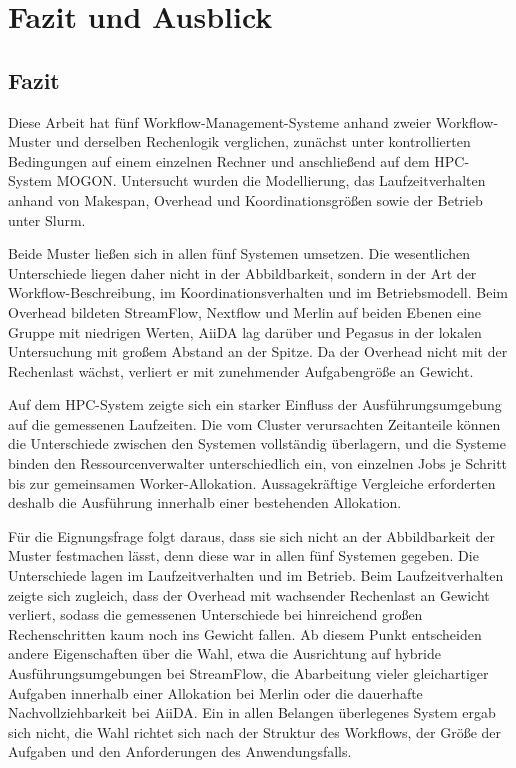 
\chapter{Fazit und Ausblick}
\label{sec:conclusion}

\section{Fazit}
\label{sec:conclusion:fazit}

Diese Arbeit hat fünf Workflow-Management-Systeme anhand zweier
Workflow-Muster und derselben Rechenlogik verglichen, zunächst
unter kontrollierten Bedingungen auf einem einzelnen Rechner und
anschließend auf dem HPC-System MOGON. Untersucht wurden die
Modellierung, das Laufzeitverhalten anhand von Makespan, Overhead
und Koordinationsgrößen sowie der Betrieb unter Slurm.

Beide Muster ließen sich in allen fünf Systemen umsetzen. Die
wesentlichen Unterschiede liegen daher nicht in der Abbildbarkeit,
sondern in der Art der Workflow-Beschreibung, im
Koordinationsverhalten und im Betriebsmodell. Beim Overhead
bildeten StreamFlow, Nextflow und Merlin auf beiden Ebenen eine
Gruppe mit niedrigen Werten, AiiDA lag darüber und Pegasus in der
lokalen Untersuchung mit großem Abstand an der Spitze. Da der
Overhead nicht mit der Rechenlast wächst, verliert er mit
zunehmender Aufgabengröße an Gewicht.

Auf dem HPC-System zeigte sich ein starker Einfluss der
Ausführungsumgebung auf die gemessenen Laufzeiten. Die vom Cluster verursachten Zeitanteile können die Unterschiede zwischen den Systemen vollständig überlagern, und die Systeme binden den Ressourcenverwalter
unterschiedlich ein, von einzelnen Jobs je Schritt bis zur
gemeinsamen Worker-Allokation. Aussagekräftige Vergleiche
erforderten deshalb die Ausführung innerhalb einer bestehenden
Allokation.

Für die Eignungsfrage folgt daraus, dass sie sich nicht an der
Abbildbarkeit der Muster festmachen lässt, denn diese war in allen
fünf Systemen gegeben. Die Unterschiede lagen im Laufzeitverhalten
und im Betrieb. Beim Laufzeitverhalten zeigte sich zugleich, dass
der Overhead mit wachsender Rechenlast an Gewicht verliert, sodass
die gemessenen Unterschiede bei hinreichend großen Rechenschritten
kaum noch ins Gewicht fallen. Ab diesem Punkt entscheiden andere Eigenschaften über die Wahl, etwa die Ausrichtung auf hybride Ausführungsumgebungen bei
StreamFlow, die Abarbeitung vieler gleichartiger Aufgaben innerhalb
einer Allokation bei Merlin oder die dauerhafte Nachvollziehbarkeit
bei AiiDA. Ein in allen Belangen überlegenes System ergab sich nicht,
die Wahl richtet sich nach der Struktur des Workflows, der Größe
der Aufgaben und den Anforderungen des Anwendungsfalls.

